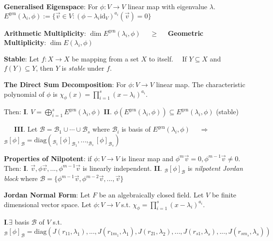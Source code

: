 \documentclass[9pt]{article}
\begin{document}
\textbf{Generalised Eigenspace}: For $\phi:V\to V$ linear map with eigenvalue $\lambda$. \quad $E^{\text{gen}}(\lambda_i,\phi):=\{\vec{v}\in V:(\phi-\lambda_i\text{id}_V)^{a_i}(\vec{v})=0\}$

\quad \textbf{Arithmetic Multiplicity}: $\dim E^{\text{gen}}(\lambda_i,\phi)$ \ \ $\geq$ \ \ \textbf{Geometric Multiplicity}: $\dim E(\lambda_i,\phi)$ 


\textbf{Stable}: Let $f:X\to X$ be mapping from a set $X$ to itself. \ \ If $Y\subseteq X$ and $f(Y)\subseteq Y$, then $Y$ is \textit{stable} under $f$. 

\textbf{The Direct Sum Decomposition}: For $\phi:V\to V$ linear map. The characteristic polynomial of $\phi$ is $\chi_{\phi}(x)=\prod_{i=1}^s(x-\lambda_i)^{a_i}$. 

\quad Then: \textbf{I}. $V=\bigoplus_{i=1}^s E^{\text{gen}}(\lambda_i,\phi)$ \qquad \textbf{II}. $\phi(E^{\text{gen}}(\lambda_i,\phi))\subseteq E^{\text{gen}}(\lambda_i,\phi)$ (stable)

\quad \qquad \ \ \ \textbf{III}. Let $\mathcal{B}=\mathcal{B}_1\cup\cdots\cup\mathcal{B}_s$ where $\mathcal{B}_i$ is basis of $E^{\text{gen}}(\lambda_i,\phi)$ \ \ $\Rightarrow$ \ \ $_{\mathcal{B}}[\phi]_{\mathcal{B}}=\text{diag}(_{\mathcal{B}_1}[\phi]_{\mathcal{B}_1},...,_{\mathcal{B}_s}[\phi]_{\mathcal{B}_s})$

{\tiny \np \textbf{Properties of Nilpotent}: if $\phi:V\to V$ is linear map and $\phi^m\vec{v}=0,\phi^{m-1}\vec{v}\ne0$. \quad Then: \textbf{I}. $\vec{v},\phi\vec{v},...,\phi^{m-1}\vec{v}$ is linearly independent. \quad \textbf{II}. $_{\mathcal{B}}[\phi]_{\mathcal{B}}$ is \textit{nilpotent Jordan block} where $\mathcal{B}=\{\phi^{m-1}\vec{v},\phi^{m-2}\vec{v},...,\vec{v}\}$}

\textbf{Jordan Normal Form}: {\small Let $F$ be an algebraically closed field. Let $V$ be finite dimensional vector space. Let $\phi:V\to V$ s.t. $\chi_{\phi}=\prod_{i=1}^s(x-\lambda_i)^{a_i}$.}

\textbf{I}.$\exists$ basis $\mathcal{B}$ of $V$ s.t. $_{\mathcal{B}}[\phi]_{\mathcal{B}}=\text{diag}(J(r_{11},\lambda_1), ... , J(r_{1m_1},\lambda_1), J(r_{21},\lambda_2), ... , J(r_{s1},\lambda_s), ... , J(r_{sm_s},\lambda_s))$
\end{document}
